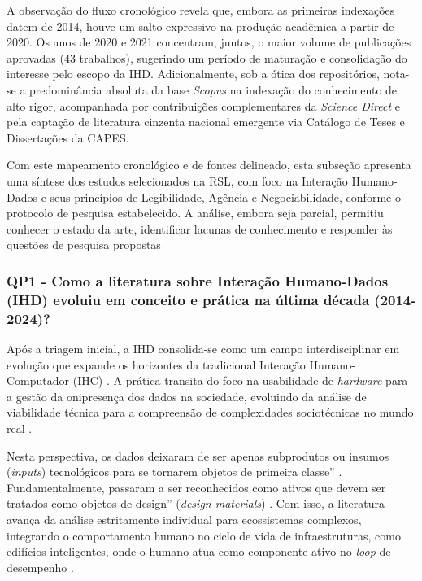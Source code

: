 \documentclass[
	12pt,				%
	oneside,			%
	a4paper,			%
	english,			%
	brazil				%
	]{abntex2ppgsi}
\begin{document}
    A observação do fluxo cronológico revela que, embora as primeiras indexações datem de 2014, houve um salto expressivo na produção acadêmica a partir de 2020. Os anos de 2020 e 2021 concentram, juntos, o maior volume de publicações aprovadas (43 trabalhos), sugerindo um período de maturação e consolidação do interesse pelo escopo da IHD. Adicionalmente, sob a ótica dos repositórios, nota-se a predominância absoluta da base \textit{Scopus} na indexação do conhecimento de alto rigor, acompanhada por contribuições complementares da \textit{Science Direct} e pela captação de literatura cinzenta nacional emergente via Catálogo de Teses e Dissertações da CAPES.

    Com este mapeamento cronológico e de fontes delineado, esta subseção apresenta uma síntese dos estudos selecionados na RSL, com foco na Interação Humano-Dados e seus princípios de Legibilidade, Agência e Negociabilidade, conforme o protocolo de pesquisa estabelecido. A análise, embora seja parcial, permitiu conhecer o estado da arte, identificar lacunas de conhecimento e responder às questões de pesquisa propostas

   
    \subsubsection{QP1 - Como a literatura sobre Interação Humano-Dados (IHD) evoluiu em conceito e prática na última década (2014-2024)?}

   Após a triagem inicial, a IHD consolida-se como um campo interdisciplinar em evolução que expande os horizontes da tradicional Interação Humano-Computador (IHC) . A prática transita do foco na usabilidade de \textit{hardware} para a gestão da onipresença dos dados na sociedade, evoluindo da análise de viabilidade técnica para a compreensão de complexidades sociotécnicas no mundo real \cite{sailaja2021exploring}.
   
    Nesta perspectiva, os dados deixaram de ser apenas subprodutos ou insumos (\textit{inputs}) tecnológicos para se tornarem objetos de primeira classe'' \cite{calvetti2024human, Raj2023, Crabtree2021, Koesten2020}. Fundamentalmente, passaram a ser reconhecidos como ativos que devem ser tratados como objetos de design'' (\textit{design materials}) \cite{seidelin2020foregrounding}. Com isso, a literatura avança da análise estritamente individual para ecossistemas complexos, integrando o comportamento humano no ciclo de vida de infraestruturas, como edifícios inteligentes, onde o humano atua como componente ativo no \textit{loop} de desempenho \cite{bavaresco2019technological}.
    
\end{document}
